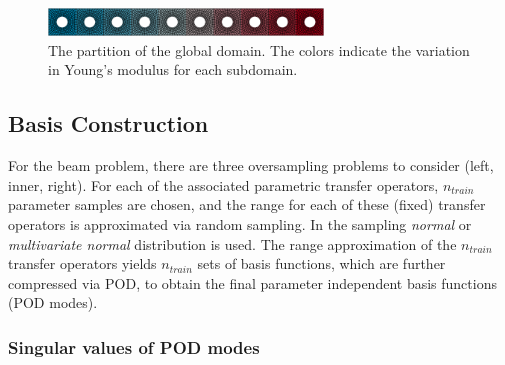 \documentclass[a4paper]{eccomas_paper-2024}
\begin{document}
\begin{figure}
    \begin{center}
        \includegraphics[width=0.65\textwidth]{../figures/beam/global_domain.png}
    \end{center}
    \caption{The partition of the global domain. The colors indicate the variation in Young's modulus for each subdomain.}\label{fig:global_domain}
\end{figure}

\subsection{Basis Construction}
For the beam problem, there are three oversampling problems to consider (left, inner, right).
For each of the associated parametric transfer operators, $n_{train}$ parameter samples are chosen, and
the range for each of these (fixed) transfer operators is approximated via random sampling. In
the sampling \textit{normal} or \textit{multivariate normal} distribution is used.
The range approximation of the $n_{train}$ transfer operators yields $n_{train}$ sets of
basis functions, which are further compressed via POD, to obtain the final parameter
independent basis functions (POD modes).

\subsubsection{Singular values of POD modes}
\end{document}
